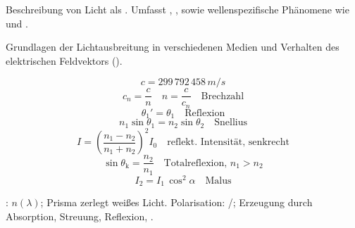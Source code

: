 

\begin{runintext}
Beschreibung von Licht als . Umfasst , ,  sowie wellenspezifische Phänomene wie  und .
\end{runintext}

\begin{runintext}
Grundlagen der Lichtausbreitung in verschiedenen Medien und Verhalten des elektrischen Feldvektors ().
\end{runintext}
\begin{formulabox}
\[ c = 299\,792\,458\,\si{m/s} \]
\[ c_n = \frac{c}{n} \quad n = \frac{c}{c_n} \quad \text{Brechzahl} \]
\formulasep
\[ \theta_1' = \theta_1 \quad \text{Reflexion} \]
\[ n_1\sin\theta_1 = n_2\sin\theta_2 \quad \text{Snellius} \]
\[ I = \left(\frac{n_1-n_2}{n_1+n_2}\right)^2 I_0 \quad \text{reflekt. Intensität, senkrecht} \]
\[ \sin\theta_{\mathrm{k}} = \frac{n_2}{n_1} \quad \text{Totalreflexion, $n_1>n_2$} \]
\formulasep
\[ I_2 = I_1\,\cos^2\alpha \quad \text{Malus} \]
\end{formulabox}
\begin{runintext}
: $n(\lambda)$; Prisma zerlegt weißes Licht. Polarisation: /; Erzeugung durch Absorption, Streuung, Reflexion, .
\end{runintext}

